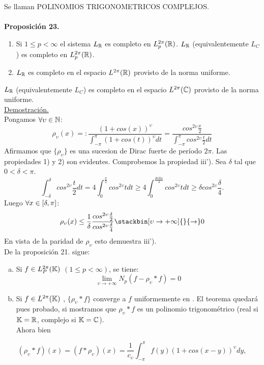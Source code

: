 Se llaman POLINOMIOS TRIGONOMETRICOS COMPLEJOS. \\ \\
\textbf{Proposición 23.} \\
\begin{enumerate}[1)]
\item Si $1 \leq p <\infty$ el sistema $L_{\mathbb{R}}$ es completo en $L_p^{2\pi}(\mathbb{R})$. $L_{\mathbb{R}}$ (equivalentemente $L_C$) es completo en $L_p^{2 \pi}(\mathbb{R})$. \\
\item $L_{\mathbb{R}}$ es completo en el espacio $L^{2\pi} (\mathbb{R})$ provisto de la norma uniforme.
\end{enumerate}
$L_{\mathbb{R}}$ (equivalentemente $L_C$) es completo en el espacio $L^{2\pi}(\mathbb{C})$ provisto de la norma uniforme.\\
\underline{Demostración.}\\
Pongamos $\forall \upsilon \in \mathbb{N}$:
$$
\rho_\upsilon (x)=:\frac{(1+cos(x))^\upsilon}{\int_{-\pi}^\pi (1+cos(t))^\upsilon dt}=\frac{cos^{2\upsilon}\frac{x}{2}}{\int_{-\pi}^\pi cos^{2\upsilon}\frac{t}{2}dt}
$$
Afirmamos que $\lbrace \rho_\upsilon \rbrace$ es una sucesion de Dirac fuerte de período $2\pi$. Las propiedades 1) y 2) son evidentes. Comprobemos la propiedad iii'). Sea $\delta$ tal que $0<\delta<\pi$. 
$$
\int_{-\delta}^{\delta}cos^{2\upsilon}\frac{t}{2}dt=4\int_0^\frac{\pi}{2} cos^{2\upsilon}t dt \geq 4 \int_{0}^{\frac{delta}{4}}cos^{2\upsilon}t dt \geq \delta cos^{2\upsilon}\frac{\delta}{4}.
$$
Luego $\forall x \in [\delta,\pi]$: 
$$
\rho_\upsilon (x) \leq \frac{1}{\delta}\frac{cos^{2 \upsilon}\frac{\delta}{2}}{cos^{2 \upsilon}\frac{\delta}{4}} \stackbin[\upsilon \to +\infty]{}{\flecha}0
$$
En vista de la paridad de $\rho_\upsilon$ esto demuestra iii').\\
De la proposición 21. sigue:
\begin{enumerate}[a)]
\item Si $f \in L_P^{2 \pi} (\mathbb{K})$ $(1 \leq p <\infty)$, se tiene:
$$
\lim_{\upsilon \to +\infty}N_p (f-\rho_\upsilon * f)=0
$$
\item Si $f \in L^{2 \pi}(\mathbb{K})$ , $\lbrace \rho_\upsilon * f \rbrace$ converge a $f$ uniformemente en \R. El teorema quedará pues probado, si mostramos que $\rho_\upsilon *f$ es un polinomio trigonométrico (real si $\mathbb{K}=\mathbb{R}$, complejo si $\mathbb{K}=\mathbb{C}$). \\
Ahora bien
\end{enumerate}
\begin{equation}
(\rho_\upsilon * f)(x)=(f*\rho_\upsilon )(x)=\frac{1}{c_\upsilon}\int_{-\pi}^\pi f(y)(1+cos(x-y))^\upsilon dy,
\end{equation}



